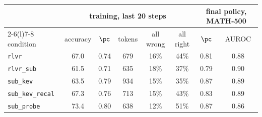 \begin{tabular}{@{}lccccccc@{}}
\toprule
 & \multicolumn{5}{c}{training, last 20 steps} & \multicolumn{2}{c}{final policy, MATH-500} \\ \cmidrule(lr){2-6}\cmidrule(l){7-8}
condition & accuracy & \kev{} $\pc$ & tokens & all wrong & all right & \kev{} $\pc$ & \kev{} AUROC \\ \midrule
\texttt{rlvr} & 67.0 & 0.74 & 679 & 16\% & 44\% & 0.81 & 0.88 \\
\texttt{rlvr\_sub} & 61.5 & 0.71 & 635 & 18\% & 37\% & 0.79 & 0.90 \\
\texttt{sub\_kev} & 63.5 & 0.79 & 934 & 15\% & 35\% & 0.87 & 0.89 \\
\texttt{sub\_kev\_recal} & 67.3 & 0.76 & 713 & 15\% & 43\% & 0.83 & 0.89 \\
\texttt{sub\_probe} & 73.4 & 0.80 & 638 & 12\% & 51\% & 0.87 & 0.86 \\
\bottomrule
\end{tabular}
